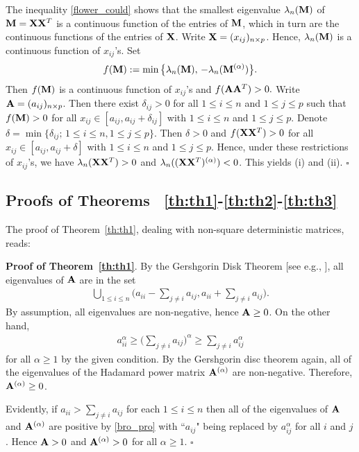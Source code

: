 \documentclass[conference,letterpaper]{IEEEtran}
\numberwithin{equation}{section}
\newcommand{\lbl}{\label}
\newcommand{\bd}{\bold}
\newcommand{\beaa}{\begin{eqnarray*}}
\newcommand{\eeaa}{\end{eqnarray*}}
\newcommand{\bea}{\begin{eqnarray}}
\newcommand{\eea}{\end{eqnarray}}
\begin{document}
 The inequality \eqref{flower_could} shows that the smallest eigenvalue $\lambda_n(\bd{M})$ of $\bd{M}=\bd{X}\bd{X}^T$ is a continuous function of the entries of $\bd{M}$, which in turn are the continuous functions of the entries of $\bd{X}$. Write $\bd{X}=(x_{ij})_{n\times p}$.  Hence, $\lambda_n(\bd{M})$ is a continuous function of $x_{ij}$'s. Set
 \beaa
f(\bd{M}):=\min\big\{\lambda_n(\bd{M}),\, -\lambda_n(\bd{M}^{(\alpha)})\big\}.
\eeaa
Then $f(\bd{M})$ is a continuous function of $x_{ij}$'s and $f(\bd{A}\bd{A}^T)>0.$ Write  $\bd{A}=(a_{ij})_{n\times p}$. Then there exist $\delta_{ij}>0$ for all $1\leq i\leq n$ and $1\leq j \leq p$ such that $f(\bd{M})>0$ for all $x_{ij}\in [a_{ij}, a_{ij}+\delta_{ij}]$ with $1\leq i\leq n$ and $1\leq j \leq p$. Denote $\delta=\min\{\delta_{ij};\, 1\leq i\leq n, 1\leq j \leq p\}.$ Then $\delta>0$ and $f(\bd{X}\bd{X}^T)>0$ for all $x_{ij}\in [a_{ij}, a_{ij}+\delta]$ with $1\leq i\leq n$ and $1\leq j \leq p$. Hence, under these restrictions of $x_{ij}$'s, we have $\lambda_n(\bd{X}\bd{X}^T)>0$ and $\lambda_n((\bd{X}\bd{X}^T)^{(\alpha)}) < 0$. This yields (i) and (ii). \hfill$\square$

\medskip


\subsection{Proofs of Theorems ~\ref{th:th1}-\ref{th:th2}-\ref{th:th3}}
The proof of Theorem~\ref{th:th1}, dealing with non-square deterministic matrices, reads:

\noindent\textbf{Proof of Theorem~\ref{th:th1}}. By the Gershgorin Disk Theorem [see e.g., \cite{horn1985}], all eigenvalues of $\bd{A}$ are in the set
\bea\lbl{bro_pro}
\bigcup_{1\leq i \leq n}\Big(a_{ii}- \sum_{j\ne i}a_{ij}, a_{ii}+ \sum_{j\ne i}a_{ij}\Big).
\eea
By assumption, all eigenvalues are non-negative, hence $\bd{A}\geq 0$. On the other hand,
\beaa
a_{ii}^{\alpha}\geq  \Big(\sum_{j\ne i}a_{ij}\Big)^{\alpha}\geq \sum_{j\ne i}a_{ij}^{\alpha}
\eeaa
for all $\alpha\geq 1$ by the given condition. By the Gershgorin disc theorem again, all of the eigenvalues of the Hadamard power matrix $\bd{A}^{(\alpha)}$ are non-negative. Therefore,  $\bd{A}^{(\alpha)}\geq  0$.

Evidently, if $a_{ii}>  \sum_{j\ne i}a_{ij}$ for each $1\leq i\leq n$ then all of the eigenvalues of  $\bd{A}$  and $\bd{A}^{(\alpha)}$ are positive by \eqref{bro_pro} with ``$a_{ij}$" being replaced by $a_{ij}^{\alpha}$ for all $i$ and $j$. Hence $\bd{A} > 0$ and $\bd{A}^{(\alpha)}> 0$ for all $\alpha\geq 1.$ \hfill$\square$
\medskip
\end{document}
